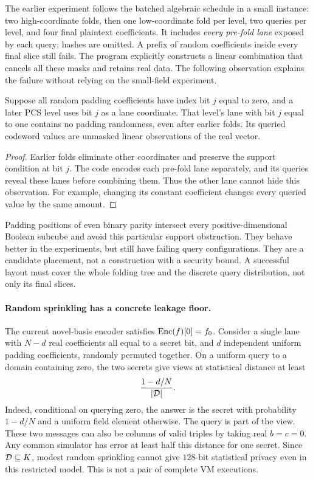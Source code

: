 The earlier experiment follows the batched algebraic schedule in a small instance: two high-coordinate folds, then one low-coordinate fold per level, two queries per level, and four final plaintext coefficients. It includes \emph{every pre-fold lane} exposed by each query; hashes are omitted. A prefix of random coefficients inside every final slice still fails. The program explicitly constructs a linear combination that cancels all these masks and retains real data. The following observation explains the failure without relying on the small-field experiment.

\begin{proposition}\label{prop:lane}
Suppose all random padding coefficients have index bit $j$ equal to zero, and a later PCS level uses bit $j$ as a lane coordinate. That level's lane with bit $j$ equal to one contains no padding randomness, even after earlier folds. Its queried codeword values are unmasked linear observations of the real vector.
\end{proposition}
\begin{proof}
Earlier folds eliminate other coordinates and preserve the support condition at bit $j$. The code encodes each pre-fold lane separately, and its queries reveal these lanes before combining them. Thus the other lane cannot hide this observation. For example, changing its constant coefficient changes every queried value by the same amount.
\end{proof}

Padding positions of even binary parity intersect every positive-dimensional Boolean subcube and avoid this particular support obstruction. They behave better in the experiments, but still have failing query configurations. They are a candidate placement, not a construction with a security bound. A successful layout must cover the whole folding tree and the discrete query distribution, not only its final slices.

\paragraph{Random sprinkling has a concrete leakage floor.} The current novel-basis encoder satisfies $\mathrm{Enc}(f)[0]=f_0$. Consider a single lane with $N-d$ real coefficients all equal to a secret bit, and $d$ independent uniform padding coefficients, randomly permuted together. On a uniform query to a domain containing zero, the two secrets give views at statistical distance at least
\[
 \frac{1-d/N}{|\mathcal{D}|}.
\]
Indeed, conditional on querying zero, the answer is the secret with probability $1-d/N$ and a uniform field element otherwise. The query is part of the view. These two messages can also be columns of valid triples by taking real $b=c=0$. Any common simulator has error at least half this distance for one secret. Since $\mathcal{D}\subseteq K$, modest random sprinkling cannot give $128$-bit statistical privacy even in this restricted model. This is not a pair of complete VM executions.

